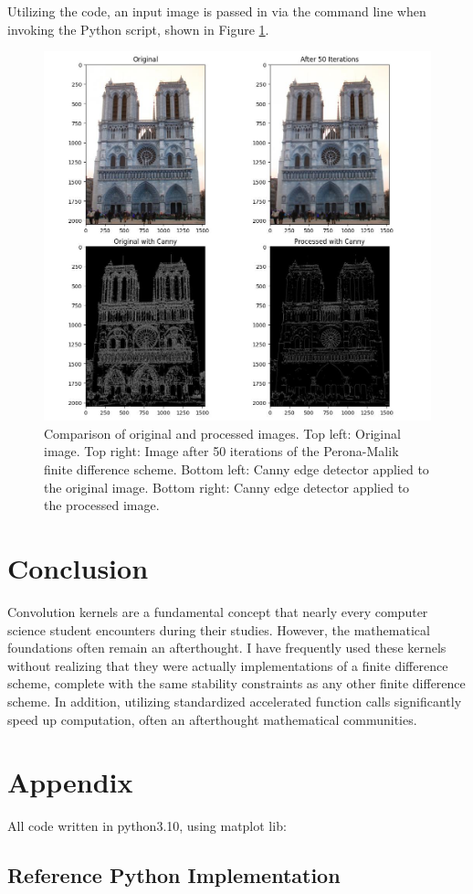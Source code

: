 \documentclass{article}
\begin{document}
Utilizing the code, an input image is passed in via the command line when invoking the Python script, shown in Figure \ref*{fig:results}.
\
\begin{figure}[H]
	\centering
	\includegraphics[width=\textwidth]{figureA.jpeg}
	\caption{Comparison of original and processed images. Top left: Original image. Top right: Image after 50 iterations of the Perona-Malik finite difference scheme. Bottom left: Canny edge detector applied to the original image. Bottom right: Canny edge detector applied to the processed image.}
	\label{fig:results}
\end{figure}

\section*{Conclusion}
Convolution kernels are a fundamental concept that nearly every computer science student encounters during their studies. However, the mathematical foundations often remain an afterthought. I have frequently used these kernels without realizing that they were actually implementations of a finite difference scheme, complete with the same stability constraints as any other finite difference scheme. In addition, utilizing standardized accelerated function calls significantly speed up computation, often an afterthought mathematical communities. 

\section*{Appendix}
All code written in python3.10, using matplot lib:
\subsection*{Reference Python Implementation} \label{code-perona-malik}




\end{document}
